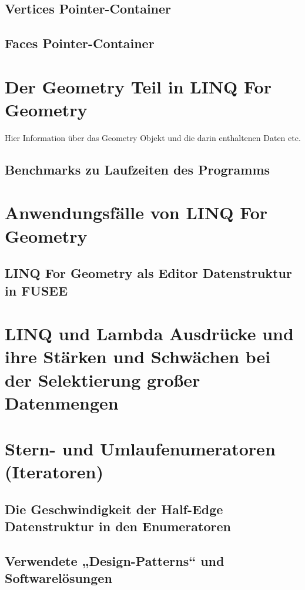 \documentclass[12pt,a4paper]{scrreprt}
\newcommand{\LFGS}{LINQ For Geometry }
\begin{document}
		\subsection {Vertices Pointer-Container}

		\subsection {Faces Pointer-Container}

	\section {Der Geometry Teil in LINQ For Geometry}
			Hier Information über das Geometry Objekt und die darin enthaltenen Daten etc.
		\subsection {Benchmarks zu Laufzeiten des Programms}
	\section {Anwendungsfälle von LINQ For Geometry}
		\subsection {\LFGS als Editor Datenstruktur in FUSEE}
	\section {LINQ und Lambda Ausdrücke und ihre Stärken und Schwächen bei der Selektierung großer Datenmengen}
	\section {Stern- und Umlaufenumeratoren (Iteratoren)}
		\subsection {Die Geschwindigkeit der Half-Edge Datenstruktur in den Enumeratoren}
		\subsection {Verwendete „Design-Patterns“ und Softwarelösungen}
\end{document}

